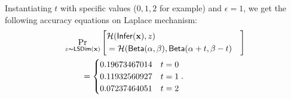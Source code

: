 \documentclass{article}
\begin{document}
Instantiating $t$ with specific values ($0,1,2$ for example) and $\epsilon = 1$, we get the following accuracy equations on Laplace mechanism:
\begin{align*}
&\lapmechPr{\dataobs}{
\begin{aligned}
\lefteqn{\hellinger(\bysinfer(\dataobs), z )}\\ 
&= \hellinger(\betad(\alpha, \beta), \betad(\alpha + t, \beta - t)
\end{aligned}
}\\
& \qquad = \begin{cases}
0.19673467014 & t = 0\\
0.11932560927 & t = 1\\
0.07237464051 & t = 2
\end{cases}.
\end{align*}
\end{document}
